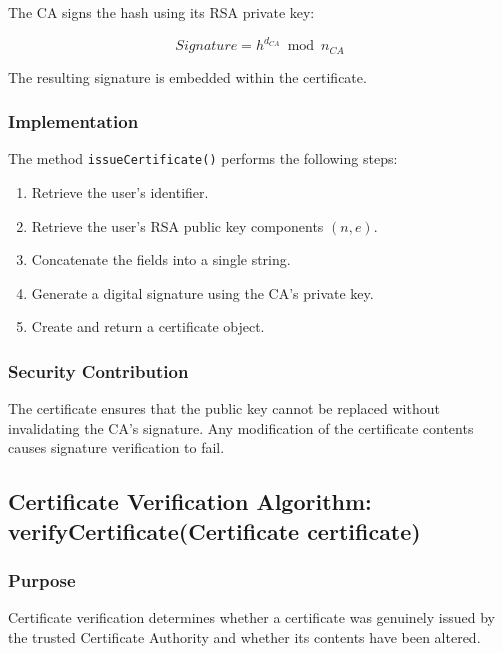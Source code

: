 \documentclass[12pt]{article}
\begin{document}
The CA signs the hash using its RSA private key:

\begin{equation}
Signature = h^{d_{CA}} \bmod n_{CA}
\end{equation}

The resulting signature is embedded within the certificate.

\subsubsection{Implementation}

The method \texttt{issueCertificate()} performs the following steps:

\begin{enumerate}
\item Retrieve the user's identifier.
\item Retrieve the user's RSA public key components $(n,e)$.
\item Concatenate the fields into a single string.
\item Generate a digital signature using the CA's private key.
\item Create and return a certificate object.
\end{enumerate}

\subsubsection{Security Contribution}

The certificate ensures that the public key cannot be replaced without
invalidating the CA's signature. Any modification of the certificate contents
causes signature verification to fail.


\subsection{Certificate Verification Algorithm: \\
verifyCertificate(Certificate certificate)}

\subsubsection{Purpose}

Certificate verification determines whether a certificate was genuinely issued
by the trusted Certificate Authority and whether its contents have been altered.
\end{document}
